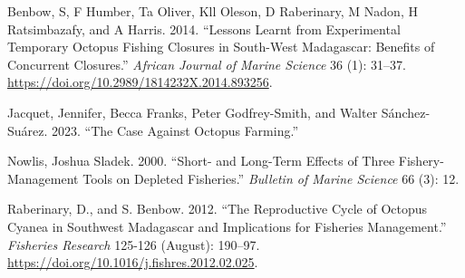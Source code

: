 \documentclass[
]{article}
\newlength{\cslhangindent}
\newlength{\cslentryspacingunit} %
\newenvironment{CSLReferences}[2] %
 {%
  \setlength{\parindent}{0pt}
  \ifodd #1
  \let\oldpar\par
  \def\par{\hangindent=\cslhangindent\oldpar}
  \fi
  \setlength{\parskip}{#2\cslentryspacingunit}
 }%
 {}
\begin{document}
\newpage

\hypertarget{refs}{}
\begin{CSLReferences}{1}{0}
\leavevmode{}%
Benbow, S, F Humber, Ta Oliver, Kll Oleson, D Raberinary, M Nadon, H Ratsimbazafy, and A Harris. 2014. {``Lessons Learnt from Experimental Temporary Octopus Fishing Closures in South-West {Madagascar}: Benefits of Concurrent Closures.''} \emph{African Journal of Marine Science} 36 (1): 31--37. \url{https://doi.org/10.2989/1814232X.2014.893256}.

\leavevmode{}%
Jacquet, Jennifer, Becca Franks, Peter Godfrey-Smith, and Walter Sánchez-Suárez. 2023. {``The {Case} {Against} {Octopus} {Farming}.''}

\leavevmode{}%
Nowlis, Joshua Sladek. 2000. {``Short- and Long-Term Effects of Three Fishery-Management Tools on Depleted Fisheries.''} \emph{Bulletin of Marine Science} 66 (3): 12.

\leavevmode{}%
Raberinary, D., and S. Benbow. 2012. {``The Reproductive Cycle of {Octopus} Cyanea in Southwest {Madagascar} and Implications for Fisheries Management.''} \emph{Fisheries Research} 125-126 (August): 190--97. \url{https://doi.org/10.1016/j.fishres.2012.02.025}.

\end{CSLReferences}
\end{document}
